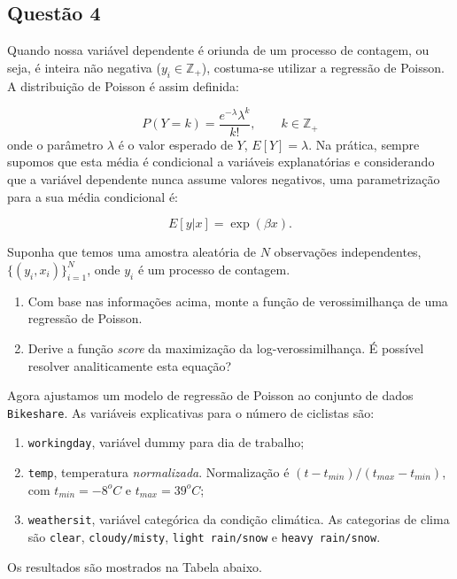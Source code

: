 \documentclass[
]{article}
\providecommand{\tightlist}{%
  \setlength{\itemsep}{0pt}\setlength{\parskip}{0pt}}
\begin{document}
\hypertarget{questuxe3o-4}{%
\subsection{Questão 4}\label{questuxe3o-4}}

Quando nossa variável dependente é oriunda de um processo de contagem,
ou seja, é inteira não negativa (\(y_i \in \mathbb{Z_+}\)), costuma-se
utilizar a regressão de Poisson. A distribuição de Poisson é assim
definida:

\[P(Y=k)=\frac{e^{-\lambda}\lambda^k}{k!}, \qquad k\in\mathbb{Z_+}\]
onde o parâmetro \(\lambda\) é o valor esperado de \(Y\),
\(E[Y]=\lambda\). Na prática, sempre supomos que esta média é
condicional a variáveis explanatórias e considerando que a variável
dependente nunca assume valores negativos, uma parametrização para a sua
média condicional é:

\[E[y|x]=\exp(\beta x).\]

Suponha que temos uma amostra aleatória de \(N\) observações
independentes, \(\{(y_i, x_i)\}_{i=1}^N\), onde \(y_i\) é um processo de
contagem.

\begin{enumerate}
\def\labelenumi{\alph{enumi})}
\item
  Com base nas informações acima, monte a função de verossimilhança de
  uma regressão de Poisson.
\item
  Derive a função \emph{score} da maximização da log-verossimilhança. É
  possível resolver analiticamente esta equação?
\end{enumerate}

Agora ajustamos um modelo de regressão de Poisson ao conjunto de dados
\texttt{Bikeshare}. As variáveis explicativas para o número de ciclistas
são:

\begin{enumerate}
\def\labelenumi{\roman{enumi})}
\tightlist
\item
  \texttt{workingday}, variável dummy para dia de trabalho;
\item
  \texttt{temp}, temperatura \emph{normalizada}. Normalização é
  \((t-t_{min})/(t_{max}-t_{min})\), com \(t_{min}=-8^oC\) e
  \(t_{max}=39^oC\);
\item
  \texttt{weathersit}, variável categórica da condição climática. As
  categorias de clima são \texttt{clear}, \texttt{cloudy/misty},
  \texttt{light\ rain/snow} e \texttt{heavy\ rain/snow}.
\end{enumerate}

Os resultados são mostrados na Tabela abaixo.
\end{document}
